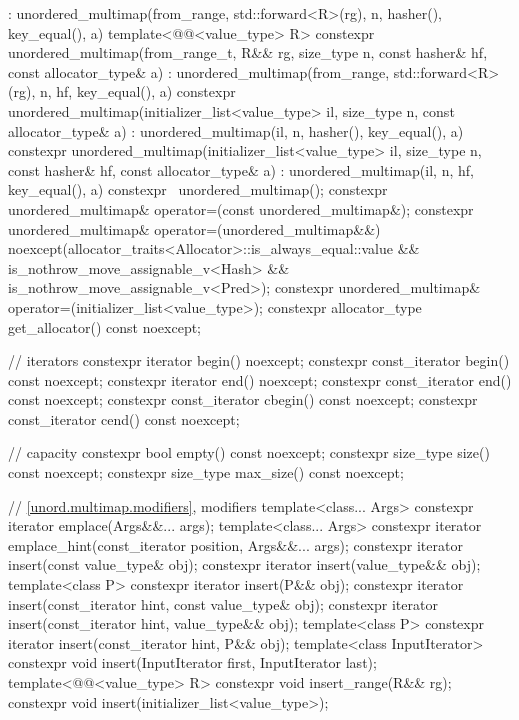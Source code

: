 \begin{codeblock}
{{        : unordered_multimap(from_range, std::forward<R>(rg),
                             n, hasher(), key_equal(), a) { }
    template<@@<value_type> R>
      constexpr unordered_multimap(from_range_t, R&& rg, size_type n, const hasher& hf,
                                   const allocator_type& a)
        : unordered_multimap(from_range, std::forward<R>(rg), n, hf, key_equal(), a) { }
    constexpr unordered_multimap(initializer_list<value_type> il, size_type n,
                                 const allocator_type& a)
      : unordered_multimap(il, n, hasher(), key_equal(), a) { }
    constexpr unordered_multimap(initializer_list<value_type> il, size_type n, const hasher& hf,
                                 const allocator_type& a)
      : unordered_multimap(il, n, hf, key_equal(), a) { }
    constexpr ~unordered_multimap();
    constexpr unordered_multimap& operator=(const unordered_multimap&);
    constexpr unordered_multimap& operator=(unordered_multimap&&)
      noexcept(allocator_traits<Allocator>::is_always_equal::value &&
               is_nothrow_move_assignable_v<Hash> && is_nothrow_move_assignable_v<Pred>);
    constexpr unordered_multimap& operator=(initializer_list<value_type>);
    constexpr allocator_type get_allocator() const noexcept;

    // iterators
    constexpr iterator       begin() noexcept;
    constexpr const_iterator begin() const noexcept;
    constexpr iterator       end() noexcept;
    constexpr const_iterator end() const noexcept;
    constexpr const_iterator cbegin() const noexcept;
    constexpr const_iterator cend() const noexcept;

    // capacity
    constexpr bool empty() const noexcept;
    constexpr size_type size() const noexcept;
    constexpr size_type max_size() const noexcept;

    // \ref{unord.multimap.modifiers}, modifiers
    template<class... Args> constexpr iterator emplace(Args&&... args);
    template<class... Args>
      constexpr iterator emplace_hint(const_iterator position, Args&&... args);
    constexpr iterator insert(const value_type& obj);
    constexpr iterator insert(value_type&& obj);
    template<class P> constexpr iterator insert(P&& obj);
    constexpr iterator insert(const_iterator hint, const value_type& obj);
    constexpr iterator insert(const_iterator hint, value_type&& obj);
    template<class P> constexpr iterator insert(const_iterator hint, P&& obj);
    template<class InputIterator> constexpr void insert(InputIterator first, InputIterator last);
    template<@@<value_type> R>
      constexpr void insert_range(R&& rg);
    constexpr void insert(initializer_list<value_type>);

}}
\end{codeblock}
